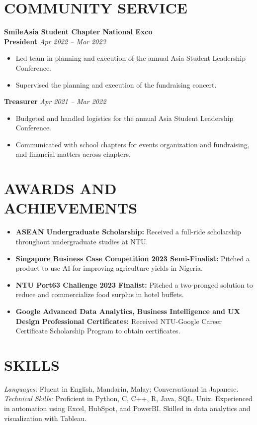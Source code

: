 \documentclass[a4paper,10pt]{article}
\begin{document}
\section{COMMUNITY SERVICE}

\vspace{3pt}
\textbf{SmileAsia Student Chapter National Exco} \\
\textbf{President} \hfill \textit{Apr 2022 -- Mar 2023}
\vspace{1pt}
\begin{itemize}
  \item Led team in planning and execution of the annual Asia Student Leadership Conference.
  \item Supervised the planning and execution of the fundraising concert.
\end{itemize}

\textbf{Treasurer} \hfill \textit{Apr 2021 -- Mar 2022}
\vspace{1pt}
\begin{itemize}
  \item Budgeted and handled logistics for the annual Asia Student Leadership Conference.
  \item Communicated with school chapters for events organization and fundraising, and financial matters across chapters.
\end{itemize}

\section{AWARDS AND ACHIEVEMENTS}

\begin{itemize}
  \item \textbf{ASEAN Undergraduate Scholarship:} Received a full-ride scholarship throughout undergraduate studies at NTU.
  \item \textbf{Singapore Business Case Competition 2023 Semi-Finalist:} Pitched a product to use AI for improving agriculture yields in Nigeria.
  \item \textbf{NTU Port63 Challenge 2023 Finalist:} Pitched a two-pronged solution to reduce and commercialize food surplus in hotel buffets.
  \item \textbf{Google Advanced Data Analytics, Business Intelligence and UX Design Professional Certificates:} Received NTU-Google Career Certificate Scholarship Program to obtain certificates.
\end{itemize}

\section{SKILLS}

\textit{Languages:} Fluent in English, Mandarin, Malay; Conversational in Japanese. \\
\textit{Technical Skills:} Proficient in Python, C, C++, R, Java, SQL, Unix. Experienced in automation using Excel, HubSpot, and PowerBI. Skilled in data analytics and visualization with Tableau.
\end{document}
